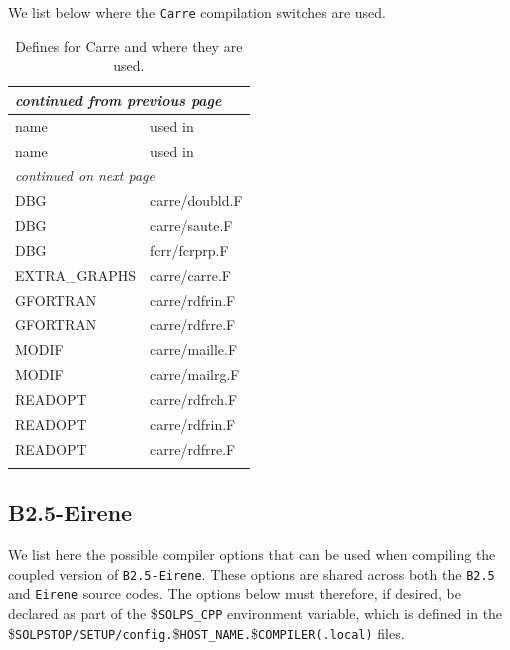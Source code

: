 \documentclass[a4paper,10pt]{report}
\begin{document}
We list below where the {\tt Carre} compilation switches are used.

\begin{center}
  \begin{longtable}{|l|l|}
    \hline
    \multicolumn{2}{|l|}{\small\sl continued from previous page} \\
    \hline name & used in \\
    \hline \endhead
    \hline name & used in \\
    \hline \endfirsthead
    \hline
    \multicolumn{2}{|l|}{\small\sl continued on next page} \\
    \hline \endfoot
    \endlastfoot
DBG & carre/doubld.F \\
DBG & carre/saute.F \\
DBG & fcrr/fcrprp.F \\
EXTRA\_GRAPHS & carre/carre.F \\
GFORTRAN & carre/rdfrin.F \\
GFORTRAN & carre/rdfrre.F \\
MODIF & carre/maille.F \\
MODIF & carre/mailrg.F \\
READOPT & carre/rdfrch.F \\
READOPT & carre/rdfrin.F \\
READOPT & carre/rdfrre.F \\
    \hline
    \caption{Defines for Carre and where they are used.}
    \label{tab:Carredefines}
  \end{longtable}
\end{center}

\subsection{B2.5-Eirene}

We list here the possible compiler options that can be used when compiling the
coupled version of {\tt B2.5-Eirene}. These options are shared across both the
{\tt B2.5} and {\tt Eirene} source codes. The options below must therefore,
if desired, be declared as part of the \${\tt SOLPS\_CPP} environment variable,
which is defined in the
\${\tt SOLPSTOP/SETUP/config.\allowbreak}\${\tt {HOST\_NAME}.}\${\tt {COMPILER}(.local)} files.
\end{document}
